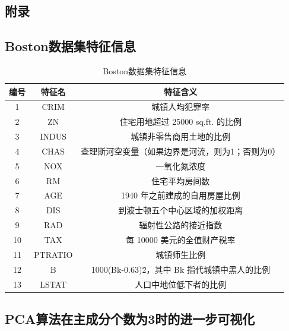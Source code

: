 \documentclass[12pt,a4paper]{article}
\theoremstyle{definition}
\begin{document}
\newpage
\begin{appendix}
	\section{附录}
	\subsection{Boston数据集特征信息}
	\label{apd:boston_char}
	\begin{table}[H]
		\renewcommand\arraystretch{1.35}
		\caption{Boston数据集特征信息}
		\label{tab:boston_char}
		\centering
		
		\begin{tabular}{c|c|c}
			\centering
			编号 & 特征名 & 特征含义 \\
			\hline
			1 & CRIM & 城镇人均犯罪率 \\
			2 & ZN & 住宅用地超过 25000 sq.ft. 的比例 \\
			3 & INDUS & 城镇非零售商用土地的比例 \\
			4 & CHAS & 查理斯河空变量（如果边界是河流，则为1；否则为0） \\
			5 & NOX & 一氧化氮浓度 \\
			6 & RM & 住宅平均房间数 \\
			7 & AGE & 1940 年之前建成的自用房屋比例 \\
			8 & DIS & 到波士顿五个中心区域的加权距离 \\
			9 & RAD & 辐射性公路的接近指数 \\
			10 & TAX & 每 10000 美元的全值财产税率 \\
			11 & PTRATIO & 城镇师生比例 \\
			12 & B & 1000(Bk-0.63)\^ 2，其中 Bk 指代城镇中黑人的比例 \\
			13 & LSTAT & 人口中地位低下者的比例 \\			
		\end{tabular}
	\end{table}
	
	\subsection{PCA算法在主成分个数为3时的进一步可视化}
	\label{apd:vis3}
	

\end{appendix}
\end{document}
